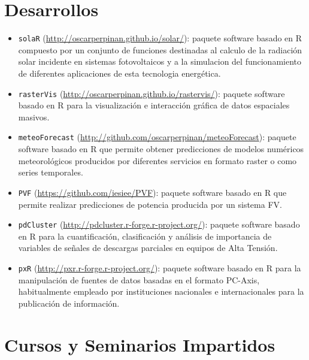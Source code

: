 \documentclass[article, a4paper]{memoir}
\begin{document}
\section{Desarrollos}
\label{sec-7}

\begin{itemize}
\item \texttt{solaR} (\url{http://oscarperpinan.github.io/solar/}): paquete software basado en R compuesto por un conjunto de funciones destinadas al calculo de la radiación solar incidente en sistemas fotovoltaicos y a la simulacion del funcionamiento de diferentes aplicaciones de esta tecnologia energética.

\item \texttt{rasterVis} (\url{http://oscarperpinan.github.io/rastervis/}): paquete software basado en R para la visualización e interacción gráfica de datos espaciales masivos.

\item \texttt{meteoForecast} (\url{http://github.com/oscarperpinan/meteoForecast}): paquete software basado en R que permite obtener predicciones de modelos numéricos meteorológicos producidos por diferentes servicios en formato raster o como series temporales.

\item \texttt{PVF} (\url{https://github.com/iesiee/PVF}): paquete software basado en R que permite realizar predicciones de potencia producida por un sistema FV.

\item \texttt{pdCluster} (\url{http://pdcluster.r-forge.r-project.org/}): paquete software basado en R para la cuantificación, clasificación y análisis de importancia de variables de señales de descargas parciales en equipos de Alta Tensión.

\item \texttt{pxR} (\url{http://pxr.r-forge.r-project.org/}): paquete software basado en R para la manipulación de fuentes de datos basadas en el formato PC-Axis, habitualmente empleado por instituciones nacionales e internacionales para la publicación de información.
\end{itemize}



\section{Cursos y Seminarios Impartidos}
\label{sec-8}
\end{document}
